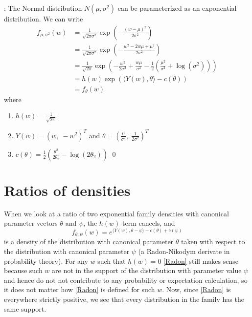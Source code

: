 \documentclass[12pt]{article}
\newcommand{\inner}[1]{\langle #1 \rangle}
\begin{document}
\vspace{0.5cm}: The Normal distribution $N(\mu, \sigma^2)$ can be parameterized as an exponential distribution. We can write
\begin{align*}
  	f_{\mu,\sigma^2}(w) &= \frac{1}{\sqrt{2\pi\sigma^2}}\exp\left(-\frac{(w-\mu)^2}{2\sigma^2}\right) \\
  	  &= \frac{1}{\sqrt{2\pi\sigma^2}}\exp\left(-\frac{w^2-2w\mu+\mu^2}{2\sigma^2}\right) \\
  	  &= \frac{1}{\sqrt{2\pi}}\exp\left(-\frac{w^2}{2\sigma^2} + \frac{w\mu}{\sigma^2} - \frac{1}{2}\left(\frac{\mu^2}{\sigma^2} + \log(\sigma^2)\right)\right) \\
 	  &= h(w)\exp\left(\inner{Y(w),\theta} - c(\theta)\right) \\
  	  &= f_\theta(w)
\end{align*}
where 
\begin{enumerate}
	\item[] $h(w) = \frac{1}{\sqrt{2\pi}}$
	\item[] $Y(w) = (w,\; -w^2)^T$ and $\theta = \left(\frac{\mu}{\sigma^2},\; \frac{1}{2\sigma^2}\right)^T$
	\item[] $c(\theta) = \frac{1}{2}\left(\frac{\theta_1^2}{2\theta_2} - \log(2\theta_2)\right)$ \qed
\end{enumerate}


\section*{Ratios of densities}
When we look at a ratio of two exponential family densities with canonical parameter vectors $\theta$ and $\psi$, the $h(w)$ term cancels, and
\begin{equation} \label{Radon}
  f_{\theta;\psi}(w) = e^{\inner{Y(w),\theta - \psi} - c(\theta) + c(\psi)}	
\end{equation}
is a density of the distribution with canonical parameter $\theta$ taken with respect to the distribution with canonical parameter $\psi$ (a Radon-Nikodym derivate in probability theory). For any $w$ such that $h(w) = 0$ \eqref{Radon} still makes sense because such $w$ are not in the support of the distribution with parameter value $\psi$ and hence do not not contribute to any probability or expectation calculation, so it does not matter how \eqref{Radon} is defined for such $w$. Now, since \eqref{Radon} is everywhere strictly positive, we see that every distribution in the family has the same support.
\end{document}
